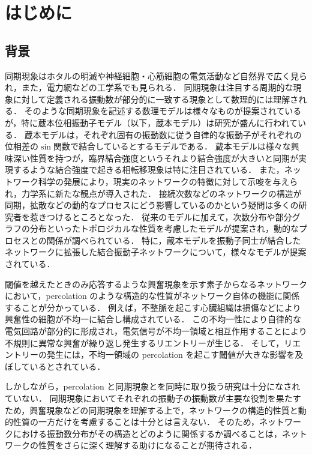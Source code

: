 \documentclass[../main]{subfiles}
\begin{document}
\chapter{はじめに}
\section{背景}
\label{chap:intro-back}
同期現象はホタルの明滅や神経細胞・心筋細胞の電気活動など自然界で広く見られ，また，電力網などの工学系でも見られる\cite{Strogatz1993,Dorfler2012}．
同期現象は注目する周期的な現象に対して定義される振動数が部分的に一致する現象として数理的には理解される．
そのような同期現象を記述する数理モデルは様々なもの\cite{Winfree1967,kuramoto1975}が提案されているが，特に蔵本位相振動子モデル（以下，蔵本モデル）は研究が盛んに行われている\cite{RevModPhys.77.137}．
蔵本モデルは，それぞれ固有の振動数に従う自律的な振動子がそれぞれの位相差の$\sin$関数で結合しているとするモデルである．
蔵本モデルは様々な興味深い性質を持つが，臨界結合強度というそれより結合強度が大きいと同期が実現するような結合強度で起きる相転移現象は特に注目されている\cite{RevModPhys.77.137,RODRIGUES20161}．
また，ネットワーク科学の発展により，現実のネットワークの特徴に対して示唆を与えられ，力学系に新たな観点が導入された\cite{RODRIGUES20161}．
接続次数などのネットワークの構造が同期，拡散などの動的なプロセスにどう影響しているのかという疑問は多くの研究者を惹きつけるところとなった．
従来のモデルに加えて，次数分布や部分グラフの分布といったトポロジカルな性質を考慮したモデルが提案され，動的なプロセスとの関係が調べられている．
特に，蔵本モデルを振動子同士が結合したネットワークに拡張した結合振動子ネットワークについて，様々なモデルが提案されている\cite{Moreno_2004,PhysRevLett.106.128701,Liu2013,PhysRevLett.124.218301}．

閾値を越えたときのみ応答するような興奮現象を示す素子からなるネットワークにおいて，percolation のような構造的な性質がネットワーク自体の機能に関係することが分かっている\cite{PhysRevLett.110.158101,Pasquale2008SelforganizationAN}．
例えば，不整脈を起こす心臓組織は損傷などにより興奮性の細胞が不均一に結合し構成されている．
この不均一性により自律的な電気回路が部分的に形成され，電気信号が不均一領域と相互作用することにより不規則に異常な興奮が繰り返し発生するリエントリーが生じる．
そして，リエントリーの発生には，不均一領域の percolation を起こす閾値が大きな影響を及ぼしているとされている\cite{PhysRevLett.110.158101}．

しかしながら，percolation と同期現象とを同時に取り扱う研究は十分になされていない．
同期現象においてそれぞれの振動子の振動数が主要な役割を果たすため，興奮現象などの同期現象を理解する上で，ネットワークの構造的性質と動的性質の一方だけを考慮することは十分とは言えない．
そのため，ネットワークにおける振動数分布がその構造とどのように関係するか調べることは，ネットワークの性質をさらに深く理解する助けになることが期待される．
\end{document}
